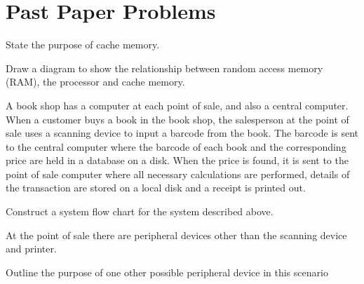 \section{Past Paper Problems}

\begin{exercise} %
	State the purpose of cache memory.
\end{exercise}
	
\begin{exercise} %
Draw a diagram to show the relationship between random access memory (RAM), the processor and cache memory.
\end{exercise}

\begin{exercise*} %
A book shop has a computer at each point of sale, and also a central computer. When a customer buys a book in the book shop, the salesperson at the point of sale uses a 
scanning device to input a barcode from the book.
The barcode is sent to the central computer where the barcode of each book and the corresponding price are held in a database on a disk.
When the price is found, it is sent to the point of sale computer where all necessary calculations are performed, details of the transaction are stored on a local disk and a receipt is printed out.

\begin{parts}
	
\item Construct a system flow chart for the system described above.
\newline

At the point of sale there are peripheral devices other than the scanning device and printer.

\item Outline the purpose of one other possible peripheral device in this scenario
\end{parts}

\end{exercise*}	
	